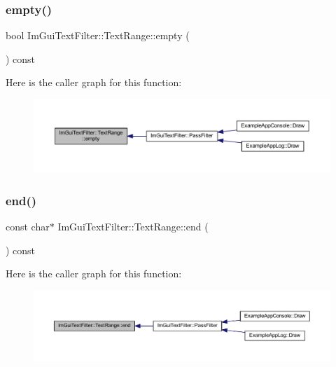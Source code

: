 \subsubsection{\texorpdfstring{empty()}{empty()}}
{\footnotesize\ttfamily bool Im\+Gui\+Text\+Filter\+::\+Text\+Range\+::empty (\begin{DoxyParamCaption}{ }\end{DoxyParamCaption}) const\hspace{0.3cm}{\ttfamily [inline]}}

Here is the caller graph for this function\+:
\nopagebreak
\begin{figure}[H]
\begin{center}
\leavevmode
\includegraphics[width=350pt]{struct_im_gui_text_filter_1_1_text_range_ab8d74e3b0ce63997746828e4b8ae3bbf_icgraph}
\end{center}
\end{figure}
\mbox{\label{struct_im_gui_text_filter_1_1_text_range_aa5d60286f4c35bfdde82219ff079de9e}} 
\subsubsection{\texorpdfstring{end()}{end()}}
{\footnotesize\ttfamily const char$\ast$ Im\+Gui\+Text\+Filter\+::\+Text\+Range\+::end (\begin{DoxyParamCaption}{ }\end{DoxyParamCaption}) const\hspace{0.3cm}{\ttfamily [inline]}}

Here is the caller graph for this function\+:
\nopagebreak
\begin{figure}[H]
\begin{center}
\leavevmode
\includegraphics[width=350pt]{struct_im_gui_text_filter_1_1_text_range_aa5d60286f4c35bfdde82219ff079de9e_icgraph}
\end{center}
\end{figure}
\mbox{\label{struct_im_gui_text_filter_1_1_text_range_af65b120c583d34df5eb857962a8ac912}} 
